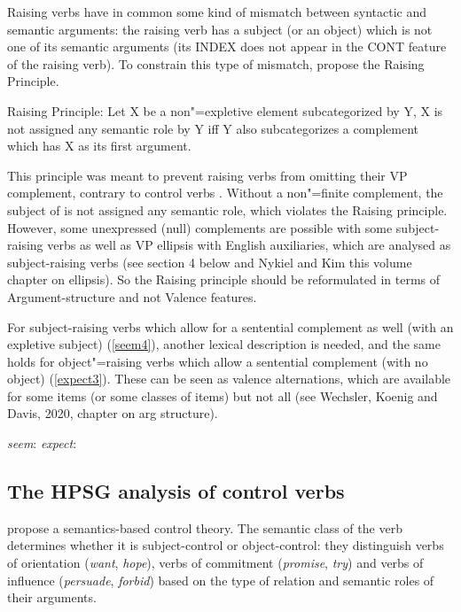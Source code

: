 \documentclass[output=paper
	        ,collection
	        ,collectionchapter
 	        ,biblatex
                ,babelshorthands
                ,newtxmath
                ,draftmode
                ,colorlinks, citecolor=brown
]{langscibook}
\begin{document}
Raising verbs have in common some kind of mismatch between syntactic and
semantic arguments: the raising verb has a subject (or an object) which is not one of its semantic
arguments (its INDEX does not appear in the CONT feature of the raising verb). To constrain this type of
mismatch, \citet[140]{PollardandSag1994} propose the Raising Principle.

\begin{exe}
\ex Raising Principle: Let X be a non"=expletive element subcategorized by Y, X is not assigned any semantic role by Y iff Y also subcategorizes a complement which has X as its first argument.
\end{exe}

This principle was meant to prevent raising verbs from omitting their VP complement, contrary to control verbs \citep{Jacobson1990}. Without a non"=finite complement, the subject of  is not assigned any semantic role, which violates the Raising principle. However, some unexpressed (null) complements are possible with some subject-raising verbs 
as well as VP ellipsis with English auxiliaries, which are analysed as subject-raising verbs (see section 4 below and Nykiel and Kim this volume chapter on ellipsis). So the Raising principle should be reformulated in terms of Argument-structure and not Valence features.

\eal
{}
\zl

For subject-raising verbs which allow for a sentential complement as well (with an expletive subject) (\ref{seem4}), another lexical description is needed, and the same holds for object"=raising verbs which allow a sentential complement (with no object) (\ref{expect3}). These can be seen as valence alternations, which are available for some items (or some classes of items) but not all (see Wechsler, Koenig and Davis, 2020, chapter on arg structure).

\eal
\ex \emph{seem}:   \argst {}
\ex \emph{expect}: \argst {}
\zl

\subsection{The HPSG analysis of control verbs}

\citet{SagandPollard1991} propose a semantics-based control theory. The semantic class of the verb determines whether it is subject-control or object-control: they distinguish verbs of orientation (\emph{want}, \emph{hope}), verbs of commitment (\emph{promise}, \emph{try}) and verbs of influence (\emph{persuade}, \emph{forbid}) based on the type of relation and semantic roles of their arguments. 
\end{document}
